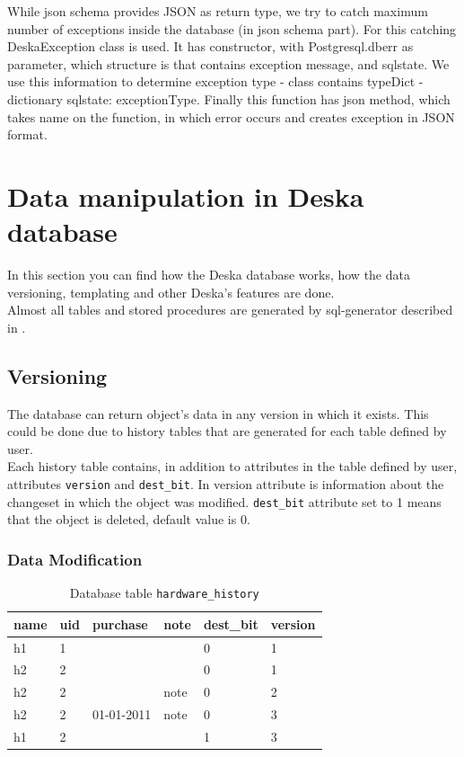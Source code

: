 \documentclass[deska]{subfiles}
\begin{document}
While json schema provides JSON as return type, we try to catch maximum number of exceptions inside the database (in
json schema part).
For this catching DeskaException class is used. It has constructor, with Postgresql.dberr as parameter, which structure is that contains exception
message, and sqlstate. We use this information to determine exception type - class contains typeDict - dictionary {sqlstate: exceptionType}.
Finally this function has json method, which takes name on the function, in which error occurs and creates exception in JSON format.

\label{sec:deska-db}

\section{Data manipulation in Deska database}
\label{sec:deska-db-data-manipulation}
In this section you can find how the Deska database works, how the data versioning, templating and other Deska's features are done.\\
Almost all tables and stored procedures are generated by sql-generator described in .

\subsection{Versioning}
\label{sec:versioning}

The database can return object's data in any version in which it exists. This could be done due to history tables that are generated for each table defined by user.\\
Each history table contains, in addition to attributes in the table defined by user, attributes {\tt version} and {\tt dest\_bit}. In version attribute is information about the changeset in which the object was modified. {\tt dest\_bit} attribute set to 1 means that the object is deleted, default value is 0.\\

\subsubsection{Data Modification}

\begin{longtable}{ l | l | l | l | l | l }
    \caption{Database table {\tt hardware\_history}}\\
    name & uid & purchase & note & dest\_bit & version\\
    \hline
    \endhead
\label{tab:example-hardwarehist}
    h1 & 1 & & & 0 & 1 \\
    h2 & 2 & & & 0 & 1 \\
    h2 & 2 & & note & 0 & 2 \\
    h2 & 2 & 01-01-2011 & note & 0 & 3 \\
    h1 & 2 & & & 1 & 3 \\
    \hline
\end{longtable}
\end{document}
